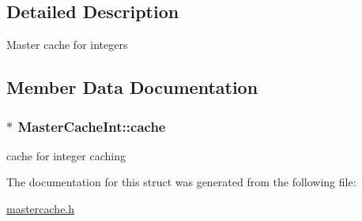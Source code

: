 \subsection{Detailed Description}
Master cache for integers 

\subsection{Member Data Documentation}
\subsubsection[{\texorpdfstring{cache}{cache}}]{$\ast$ Master\+Cache\+Int\+::cache}\hypertarget{structMasterCacheInt_a4e80ed8be2db43aa586a75118a62606a}{}\label{structMasterCacheInt_a4e80ed8be2db43aa586a75118a62606a}
cache for integer caching 

The documentation for this struct was generated from the following file\+:\begin{DoxyCompactItemize}
\item 
\hyperlink{mastercache_8h}{mastercache.\+h}\end{DoxyCompactItemize}
